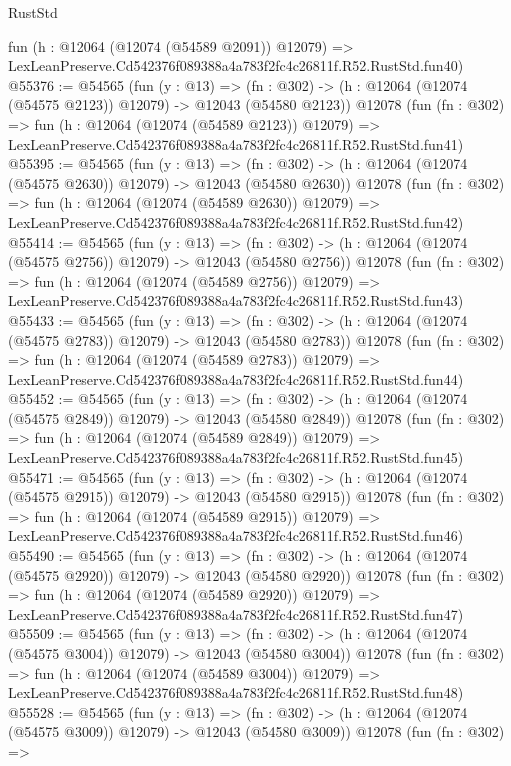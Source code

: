 \begin{lexlean}{RustStd}
\begin{coremodule}
    fun (h : @12064 (@12074 (@54589 @2091)) @12079) =>
    LexLeanPreserve.Cd542376f089388a4a783f2fc4c26811f.R52.RustStd.fun40)
@55376 := @54565
    (fun (y : @13) =>
    (fn : @302) -> (h : @12064 (@12074 (@54575 @2123)) @12079) -> @12043 (@54580 @2123))
    @12078
    (fun (fn : @302) =>
    fun (h : @12064 (@12074 (@54589 @2123)) @12079) =>
    LexLeanPreserve.Cd542376f089388a4a783f2fc4c26811f.R52.RustStd.fun41)
@55395 := @54565
    (fun (y : @13) =>
    (fn : @302) -> (h : @12064 (@12074 (@54575 @2630)) @12079) -> @12043 (@54580 @2630))
    @12078
    (fun (fn : @302) =>
    fun (h : @12064 (@12074 (@54589 @2630)) @12079) =>
    LexLeanPreserve.Cd542376f089388a4a783f2fc4c26811f.R52.RustStd.fun42)
@55414 := @54565
    (fun (y : @13) =>
    (fn : @302) -> (h : @12064 (@12074 (@54575 @2756)) @12079) -> @12043 (@54580 @2756))
    @12078
    (fun (fn : @302) =>
    fun (h : @12064 (@12074 (@54589 @2756)) @12079) =>
    LexLeanPreserve.Cd542376f089388a4a783f2fc4c26811f.R52.RustStd.fun43)
@55433 := @54565
    (fun (y : @13) =>
    (fn : @302) -> (h : @12064 (@12074 (@54575 @2783)) @12079) -> @12043 (@54580 @2783))
    @12078
    (fun (fn : @302) =>
    fun (h : @12064 (@12074 (@54589 @2783)) @12079) =>
    LexLeanPreserve.Cd542376f089388a4a783f2fc4c26811f.R52.RustStd.fun44)
@55452 := @54565
    (fun (y : @13) =>
    (fn : @302) -> (h : @12064 (@12074 (@54575 @2849)) @12079) -> @12043 (@54580 @2849))
    @12078
    (fun (fn : @302) =>
    fun (h : @12064 (@12074 (@54589 @2849)) @12079) =>
    LexLeanPreserve.Cd542376f089388a4a783f2fc4c26811f.R52.RustStd.fun45)
@55471 := @54565
    (fun (y : @13) =>
    (fn : @302) -> (h : @12064 (@12074 (@54575 @2915)) @12079) -> @12043 (@54580 @2915))
    @12078
    (fun (fn : @302) =>
    fun (h : @12064 (@12074 (@54589 @2915)) @12079) =>
    LexLeanPreserve.Cd542376f089388a4a783f2fc4c26811f.R52.RustStd.fun46)
@55490 := @54565
    (fun (y : @13) =>
    (fn : @302) -> (h : @12064 (@12074 (@54575 @2920)) @12079) -> @12043 (@54580 @2920))
    @12078
    (fun (fn : @302) =>
    fun (h : @12064 (@12074 (@54589 @2920)) @12079) =>
    LexLeanPreserve.Cd542376f089388a4a783f2fc4c26811f.R52.RustStd.fun47)
@55509 := @54565
    (fun (y : @13) =>
    (fn : @302) -> (h : @12064 (@12074 (@54575 @3004)) @12079) -> @12043 (@54580 @3004))
    @12078
    (fun (fn : @302) =>
    fun (h : @12064 (@12074 (@54589 @3004)) @12079) =>
    LexLeanPreserve.Cd542376f089388a4a783f2fc4c26811f.R52.RustStd.fun48)
@55528 := @54565
    (fun (y : @13) =>
    (fn : @302) -> (h : @12064 (@12074 (@54575 @3009)) @12079) -> @12043 (@54580 @3009))
    @12078
    (fun (fn : @302) =>

\end{coremodule}
\end{lexlean}
